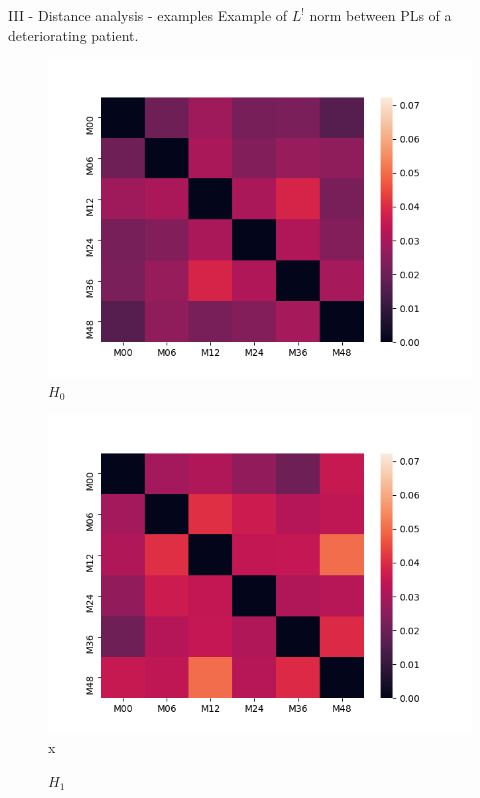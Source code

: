 \documentclass[aspectratio=169, 10pt, dvipsnames]{beamer}
\begin{document}
\begin{frame}[fragile]{III - Distance analysis - examples}
  Example of $L^!$ norm between PLs of a deteriorating patient.\\
  \begin{figure}
    \centering
     \includegraphics[width=\textwidth]{figures/temporal_evolution/ADNI029S0878_h_0.png}
    \caption{$H_0$}
  \end{figure}
  \endminipage
  \hfill
  \begin{figure}
    \centering
    \includegraphics[width=\textwidth]{figures/temporal_evolution/ADNI029S0878_h_1.png}x
    \caption{$H_1$}
  \end{figure}%

\end{frame}
\end{document}
